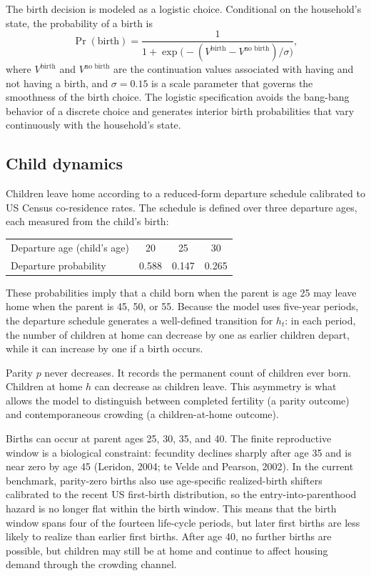 The birth decision is modeled as a logistic choice. Conditional on the household's state, the probability of a birth is
\begin{equation}\label{eq:birth_prob}
\Pr(\text{birth}) = \frac{1}{1 + \exp\!\bigl(-(V^{\text{birth}} - V^{\text{no birth}})/\sigma\bigr)},
\end{equation}
where $V^{\text{birth}}$ and $V^{\text{no birth}}$ are the continuation values associated with having and not having a birth, and $\sigma = 0.15$ is a scale parameter that governs the smoothness of the birth choice. The logistic specification avoids the bang-bang behavior of a discrete choice and generates interior birth probabilities that vary continuously with the household's state.

\subsection{Child dynamics}

Children leave home according to a reduced-form departure schedule calibrated to US Census co-residence rates. The schedule is defined over three departure ages, each measured from the child's birth:
\begin{center}
\begin{tabular}{lccc}
\toprule
Departure age (child's age) & 20 & 25 & 30 \\
Departure probability & 0.588 & 0.147 & 0.265 \\
\bottomrule
\end{tabular}
\end{center}

These probabilities imply that a child born when the parent is age 25 may leave home when the parent is 45, 50, or 55. Because the model uses five-year periods, the departure schedule generates a well-defined transition for $h_t$: in each period, the number of children at home can decrease by one as earlier children depart, while it can increase by one if a birth occurs.

Parity $p$ never decreases. It records the permanent count of children ever born. Children at home $h$ can decrease as children leave. This asymmetry is what allows the model to distinguish between completed fertility (a parity outcome) and contemporaneous crowding (a children-at-home outcome).

Births can occur at parent ages 25, 30, 35, and 40. The finite reproductive window is a
biological constraint: fecundity declines sharply after age 35 and is near zero by age 45
(Leridon, 2004; te Velde and Pearson, 2002). In the current benchmark, parity-zero births
also use age-specific realized-birth shifters calibrated to the recent US first-birth
distribution, so the entry-into-parenthood hazard is no longer flat within the birth window. This
means that the birth window spans four of the fourteen life-cycle periods, but later first births
are less likely to realize than earlier first births. After age 40, no further births are
possible, but children may still be at home and continue to affect housing demand through the
crowding channel.

